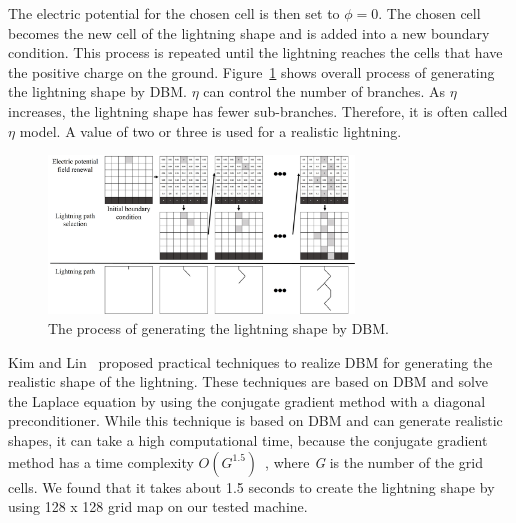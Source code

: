The electric potential for the chosen cell is then set to $\phi=0$. The chosen
cell becomes the new cell of the lightning shape and is added into a new
boundary condition.  This process is repeated until the lightning reaches the
cells that have the positive charge on the ground. Figure~\ref{fig_dbm_process}
shows overall process of generating the lightning shape by DBM. $\eta$ can
control the number of branches. As $\eta$ increases, the lightning shape has
fewer sub-branches. Therefore, it is often called $\eta$ model. A value of two
or three is used for a realistic lightning.

\begin{figure}[t]
	\centering
	\includegraphics[width=3.2in]{fig/dbm_process}
	\caption{The process of generating the lightning shape by DBM.}
	\label{fig_dbm_process}
\end{figure}





Kim and Lin~ proposed practical techniques to
realize DBM for generating the realistic shape of the lightning.
These techniques are based on DBM and
solve the
Laplace equation 
by using the conjugate gradient method with a diagonal preconditioner. 
While this technique is based on DBM and can generate realistic shapes,
it can take a high computational time,
because the conjugate gradient method 
has a time complexity $O(G^{1.5})$~\cite{Shewchuk1994}, where \textit{G} is the number of the grid
cells.
We found that it takes about 1.5 seconds to create the lightning shape by using
128 x 128 grid map on our tested machine.

